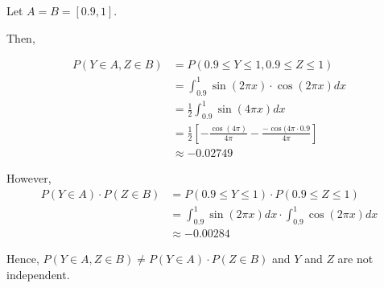 \documentclass[12pt]{article}
\begin{document}
\begin{enumerate}[(\Alph*)]
Let $A = B = [0.9, 1]$.

Then,

\begin{align*}
P(Y \in A, Z \in B) &= P(0.9 \leq Y \leq 1, 0.9 \leq Z \leq 1)\\
&= \int_0.9^1 \sin(2\pi x) \cdot \cos(2\pi x) dx\\
&= \frac{1}{2} \int_{0.9}^1 \sin(4\pi x) dx\\
&= \frac{1}{2} \left[-\frac{\cos(4\pi)}{4\pi} - \frac{-\cos(4\pi \cdot 0.9}{4\pi}\right]\\
&\approx -0.02749
\end{align*}

However,
\begin{align*}
P(Y \in A) \cdot P(Z \in B) &= P(0.9 \leq Y \leq 1) \cdot P(0.9 \leq Z \leq 1)\\
&= \int_{0.9}^1 \sin(2\pi x) dx \cdot \int_{0.9}^1 \cos(2\pi x) dx\\
&\approx -0.00284
\end{align*}

Hence, $P(Y \in A, Z \in B) \neq P(Y \in A) \cdot P(Z \in B)$ and $Y$ and $Z$ are not independent.

\end{enumerate}
\end{document}
